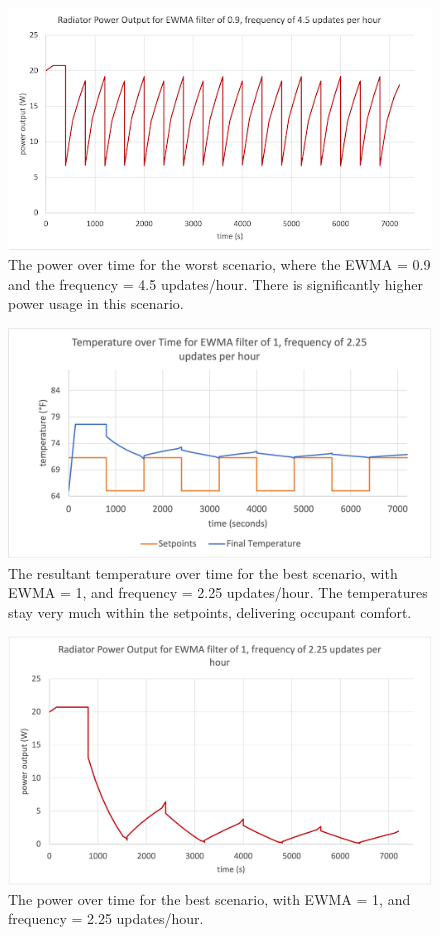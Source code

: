 \documentclass[conference,letterpaper]{IEEEtran}
\begin{document}
\begin{figure}[H]
    \includegraphics[scale=0.48]{powerworst.png}
    \caption{The power over time for the worst scenario, where the EWMA = 0.9 and the frequency = 4.5 updates/hour. There is significantly higher power usage in this scenario.}
\end{figure}
\begin{figure}[H]
    \includegraphics[scale=0.48]{tempbest.png}
    \caption{The resultant temperature over time for the best scenario, with EWMA = 1, and frequency = 2.25 updates/hour. The temperatures stay very much within the setpoints, delivering occupant comfort.}
\end{figure}
\begin{figure}[H]
    \includegraphics[scale=0.48]{powerbest.png}
    \caption{The power over time for the best scenario, with EWMA = 1, and frequency = 2.25 updates/hour. }
\end{figure}
\end{document}
